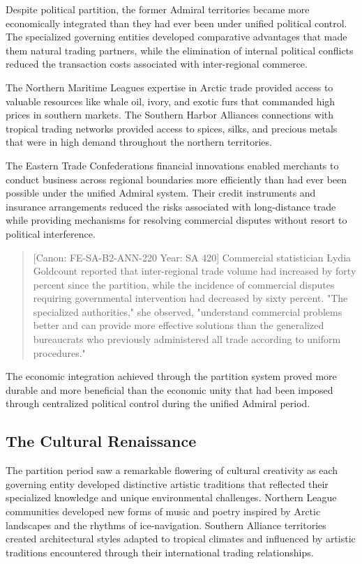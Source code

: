 Despite political partition, the former Admiral territories became more
economically integrated than they had ever been under unified political
control. The specialized governing entities developed comparative
advantages that made them natural trading partners, while the
elimination of internal political conflicts reduced the transaction
costs associated with inter-regional commerce.

The Northern Maritime League\textquotesingle s expertise in Arctic trade
provided access to valuable resources like whale oil, ivory, and exotic
furs that commanded high prices in southern markets. The Southern Harbor
Alliance\textquotesingle s connections with tropical trading networks
provided access to spices, silks, and precious metals that were in high
demand throughout the northern territories.

The Eastern Trade Confederation\textquotesingle s financial innovations
enabled merchants to conduct business across regional boundaries more
efficiently than had ever been possible under the unified Admiral
system. Their credit instruments and insurance arrangements reduced the
risks associated with long-distance trade while providing mechanisms for
resolving commercial disputes without resort to political interference.

\begin{quote}
{[}Canon: FE-SA-B2-ANN-220 \textbar{} Year: SA 420{]} Commercial
statistician Lydia Goldcount reported that inter-regional trade volume
had increased by forty percent since the partition, while the incidence
of commercial disputes requiring governmental intervention had decreased
by sixty percent. "The specialized authorities," she observed,
"understand commercial problems better and can provide more effective
solutions than the generalized bureaucrats who previously administered
all trade according to uniform procedures."
\end{quote}

The economic integration achieved through the partition system proved
more durable and more beneficial than the economic unity that had been
imposed through centralized political control during the unified Admiral
period.

\subsection{The Cultural Renaissance}\label{the-cultural-renaissance}

The partition period saw a remarkable flowering of cultural creativity
as each governing entity developed distinctive artistic traditions that
reflected their specialized knowledge and unique environmental
challenges. Northern League communities developed new forms of music and
poetry inspired by Arctic landscapes and the rhythms of ice-navigation.
Southern Alliance territories created architectural styles adapted to
tropical climates and influenced by artistic traditions encountered
through their international trading relationships.


